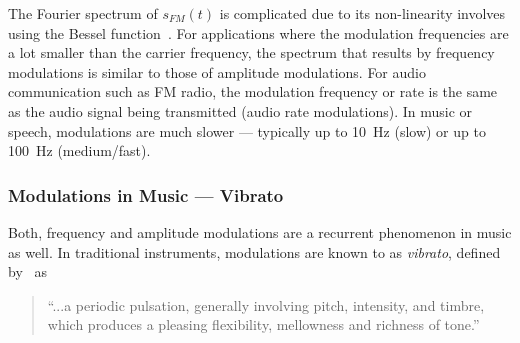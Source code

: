 The Fourier spectrum of $s_{FM}(t)$ is complicated due to its non-linearity involves using the Bessel function~\cite{abramowitz64}.
For applications where the modulation frequencies are a lot smaller than the carrier frequency, the spectrum that results by frequency modulations is similar to those of amplitude modulations.
For audio communication such as FM radio, the modulation frequency or rate is the same as the audio signal being transmitted (audio rate modulations).
In music or speech, modulations are much slower --- typically up to 10~\si{\hertz} (slow) or up to 100~\si{\hertz} (medium/fast).

\subsubsection*{Modulations in Music --- Vibrato}

Both, frequency and amplitude modulations are a recurrent phenomenon in music as well.
In traditional instruments, modulations are known to as \emph{vibrato}, defined by~\cite{seashore31} as

\begin{quote}
``...a periodic pulsation, generally involving pitch, intensity, and timbre, which produces a pleasing flexibility, mellowness and richness of tone.''
\end{quote}


